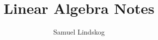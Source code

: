 \documentclass[nobib,notoc]{tufte-handout}
\begin{document}
\theoremstyle{definition}\newtheorem{defi}{Definition}[section]
\theoremstyle{definition}\newtheorem{thm}{Theorem}[section]
\theoremstyle{definition}\newtheorem{cor}{Corollary}[section]
\theoremstyle{definition}\newtheorem{lem}{Lemma}[section]
\theoremstyle{remark}\newtheorem*{notat}{Notation}



\title{Linear Algebra Notes}
\author{Samuel Lindskog}
\maketitle

\setcounter{section}{1}
\setcounter{tocdepth}{1}
\end{document}
